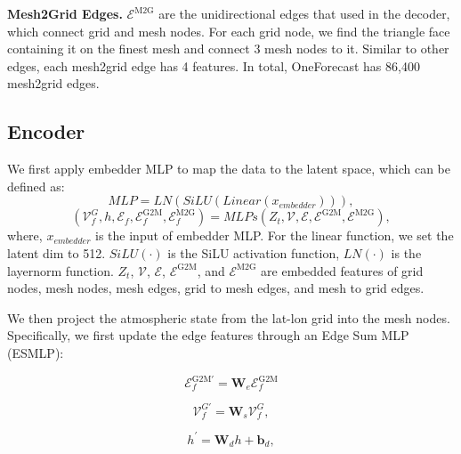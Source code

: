 \textbf{Mesh2Grid Edges.} $\mathcal{E}^{\mathrm{M} 2 \mathrm{G}}$ are the unidirectional edges that used in the decoder, which connect grid and mesh nodes. For each grid node, we find the triangle face containing it on the finest mesh and connect 3 mesh nodes to it. Similar to other edges, each mesh2grid edge has 4 features. In total, OneForecast has 86,400 mesh2grid edges.

\subsection{Encoder}
    We first apply embedder MLP to map the data to the latent space, which can be defined as:
    \begin{equation}
        MLP = LN(SiLU(Linear(x_{embedder}))),
    \end{equation}
    \begin{equation}
        (\mathcal{V}_f^G, h, \mathcal{E}_f, \mathcal{E}^{\mathrm{G} 2 \mathrm{M}}_f, \mathcal{E}^{\mathrm{M} 2 \mathrm{G}}_f) = MLPs(Z_t, \mathcal{V}, \mathcal{E}, \mathcal{E}^{\mathrm{G} 2 \mathrm{M}}, \mathcal{E}^{\mathrm{M} 2 \mathrm{G}}),
    \end{equation}
    where, $x_{embedder}$ is the input of embedder MLP. For the linear function, we set the latent dim to 512. $SiLU(\cdot)$ is the SiLU activation function, $LN(\cdot)$ is the layernorm function. $Z_t$, $\mathcal{V}$, $\mathcal{E}$, $\mathcal{E}^{\mathrm{G} 2 \mathrm{M}}$, and $\mathcal{E}^{\mathrm{M} 2 \mathrm{G}}$ are embedded features of grid nodes, mesh nodes, mesh edges, grid to mesh edges, and mesh to grid edges.

    We then project the atmospheric state from the lat-lon grid into the mesh nodes. Specifically, we first update the edge features through an Edge Sum MLP (ESMLP): 
   

    \begin{equation}
        \mathcal{E}_f^{\mathrm{G} 2 \mathrm{M} \prime}=\mathbf{W}_e \mathcal{E}_f^{\mathrm{G} 2 \mathrm{M}}
    \end{equation}

    \begin{equation}
        \mathcal{V}_f^{G \prime}=\mathbf{W}_s \mathcal{V}_f^G,
    \end{equation}

    \begin{equation}
        h^{\prime}=\mathbf{W}_d h+\mathbf{b}_d,
    \end{equation}

